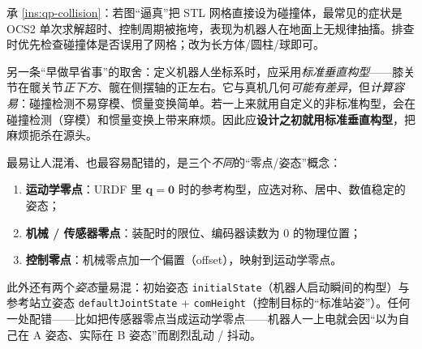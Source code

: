\begin{pitfall}
承 \cref{ins:qp-collision}：若图“逼真”把 STL 网格直接设为碰撞体，最常见的症状是 OCS2 单次求解超时、控制周期被拖垮，表现为机器人在地面上无规律抽搐。排查时优先检查碰撞体是否误用了网格；改为长方体/圆柱/球即可。
\end{pitfall}

\begin{insight}\label{ins:qp-standard-config}
另一条“早做早省事”的取舍：定义机器人坐标系时，应采用\emph{标准垂直构型}——膝关节在髋关节\emph{正下方}、髋在侧摆轴的正左右。它与真机几何\emph{可能有差异}，但\emph{计算容易}：碰撞检测不易穿模、惯量变换简单。若一上来就用自定义的非标准构型，会在碰撞检测（穿模）和惯量变换上带来麻烦\cite{sleiman2021unified}。因此应\textbf{设计之初就用标准垂直构型}，把麻烦扼杀在源头。
\end{insight}

\begin{insight}\label{ins:qp-zero}
最易让人混淆、也最容易配错的，是三个\emph{不同}的“零点/姿态”概念：
\begin{enumerate}
  \item \textbf{运动学零点}：URDF 里 $\boldsymbol{q}=\boldsymbol{0}$ 时的参考构型，应选对称、居中、数值稳定的姿态；
  \item \textbf{机械 / 传感器零点}：装配时的限位、编码器读数为 $0$ 的物理位置；
  \item \textbf{控制零点}：机械零点加一个偏置（offset），映射到运动学零点。
\end{enumerate}
此外还有两个\emph{姿态}量易混：初始姿态 \texttt{initialState}（机器人启动瞬间的构型）与参考站立姿态 \texttt{defaultJointState} + \texttt{comHeight}（控制目标的“标准站姿”）。任何一处配错——比如把传感器零点当成运动学零点——机器人一上电就会因“以为自己在 A 姿态、实际在 B 姿态”而剧烈乱动 / 抖动\cite{sleiman2021unified}。
\end{insight}


